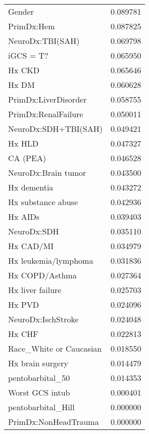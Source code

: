 \begin{tabular}{lr}
Gender                         &   0.089781 \\
PrimDx:Hem                     &   0.087825 \\
NeuroDx:TBI(SAH)               &   0.069798 \\
iGCS = T?                      &   0.065950 \\
Hx CKD                         &   0.065646 \\
Hx DM                          &   0.060628 \\
PrimDx:LiverDisorder           &   0.058755 \\
PrimDx:RenalFailure            &   0.050011 \\
NeuroDx:SDH+TBI(SAH)           &   0.049421 \\
Hx HLD                         &   0.047327 \\
CA (PEA)                       &   0.046528 \\
NeuroDx:Brain tumor            &   0.043500 \\
Hx dementia                    &   0.043272 \\
Hx substance abuse             &   0.042936 \\
Hx AIDs                        &   0.039403 \\
NeuroDx:SDH                    &   0.035110 \\
Hx CAD/MI                      &   0.034979 \\
Hx leukemia/lymphoma           &   0.031836 \\
Hx COPD/Asthma                 &   0.027364 \\
Hx liver failure               &   0.025703 \\
Hx PVD                         &   0.024096 \\
NeuroDx:IschStroke             &   0.024048 \\
Hx CHF                         &   0.022813 \\
Race\_White or Caucasian        &   0.018550 \\
Hx brain surgery               &   0.014479 \\
pentobarbital\_50               &   0.014353 \\
Worst GCS intub                &   0.000401 \\
pentobarbital\_Hill             &   0.000000 \\
PrimDx:NonHeadTrauma           &   0.000000 \\
\bottomrule
\end{tabular}
